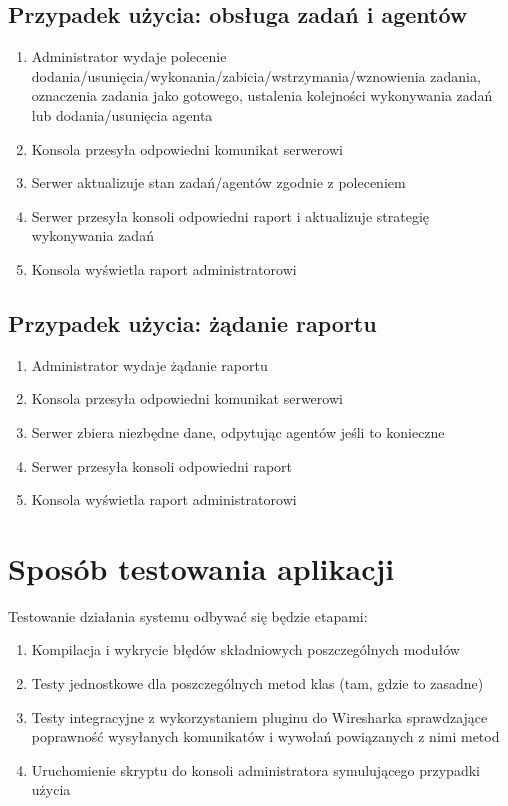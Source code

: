 \documentclass[10pt,a4paper]{article}
\begin{document}
        \subsection{Przypadek użycia: obsługa zadań i agentów}
            \begin{enumerate}
	            \item Administrator wydaje polecenie dodania/usunięcia/wykonania/zabicia/wstrzymania/wznowienia zadania, oznaczenia zadania jako gotowego, ustalenia kolejności wykonywania zadań lub dodania/usunięcia agenta
	            \item Konsola przesyła odpowiedni komunikat serwerowi
	            \item Serwer aktualizuje stan zadań/agentów zgodnie z poleceniem
	            \item Serwer przesyła konsoli odpowiedni raport i aktualizuje strategię wykonywania zadań
	            \item Konsola wyświetla raport administratorowi
            \end{enumerate}
        
        \subsection{Przypadek użycia: żądanie raportu}
            \begin{enumerate}
	            \item Administrator wydaje żądanie raportu
	            \item Konsola przesyła odpowiedni komunikat serwerowi
	            \item Serwer zbiera niezbędne dane, odpytując agentów jeśli to konieczne
	            \item Serwer przesyła konsoli odpowiedni raport
	            \item Konsola wyświetla raport administratorowi
            \end{enumerate}
    
	\section{Sposób testowania aplikacji}
		Testowanie działania systemu odbywać się będzie etapami: \\
		\begin{enumerate}
		    \item Kompilacja i wykrycie błędów składniowych poszczególnych modułów
		    \item Testy jednostkowe dla poszczególnych metod klas (tam, gdzie to zasadne)
		    \item Testy integracyjne z wykorzystaniem pluginu do Wiresharka sprawdzające poprawność wysyłanych komunikatów i wywołań powiązanych z nimi metod
		    \item Uruchomienie skryptu do konsoli administratora symulującego przypadki użycia
	    \end{enumerate}
	    
\end{document}

